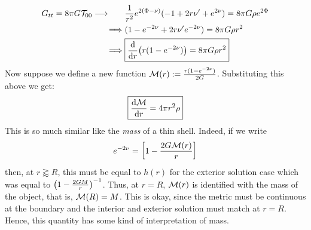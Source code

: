 \begin{align*}
    G_{tt} = 8\pi G\mathcal T_{00}\longrightarrow\qquad &\frac{1}{r^2}e^{2(\Phi-\nu)}(-1 +2r\nu'+e^{2\nu})=8\pi G \rho e^{2\Phi}\\
    \implies &(1-e^{-2\nu}+2r\nu'e^{-2\nu})=8\pi G\rho r^2\\
    \implies & \boxed{\dv{r}\qty(r(1-e^{-2\nu})) = 8\pi G\rho r^2}\\
\end{align*}
Now suppose we define a new function $\mathcal M(r) :=\frac{r(1-e^{-2\nu})}{2G}$. Substituting this above we get:
\begin{equation}\label{eqn:TOV1}
    \boxed{\dv{\mathcal M}{r} = 4\pi r^2\rho}
\end{equation}
This is so much similar like the \textit{mass} of a thin shell. Indeed, if we write 
$$e^{-2\nu} = \qty[1 - \frac{2G\mathcal M(r)}{r}]$$
then, at $r\gtrapprox R$, this must be equal to $h(r)$ for the exterior solution case which was equal to $\qty(1-\frac{2GM}{r})^{-1}$. Thus, at $r=R$, $\mathcal M(r)$ is identified with the mass of the object, that is, $\mathcal M(R) = M$. This is okay, since the metric must be continuous at the boundary and the interior and exterior solution must match at $r=R$. Hence, this quantity has some kind of interpretation of mass. 
